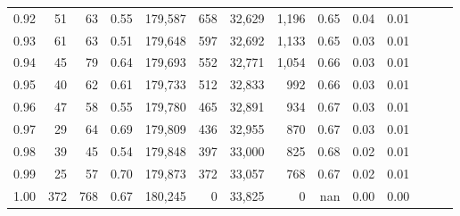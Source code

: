 \begin{tabular}{rrrrrrrrrrrrrr}
0.92 &     51 &   63 &  0.55 &  179,587 &      658 &  32,629 &   1,196 &  0.65 &  0.04 &      0.01 \\
0.93 &     61 &   63 &  0.51 &  179,648 &      597 &  32,692 &   1,133 &  0.65 &  0.03 &      0.01 \\
0.94 &     45 &   79 &  0.64 &  179,693 &      552 &  32,771 &   1,054 &  0.66 &  0.03 &      0.01 \\
0.95 &     40 &   62 &  0.61 &  179,733 &      512 &  32,833 &     992 &  0.66 &  0.03 &      0.01 \\
0.96 &     47 &   58 &  0.55 &  179,780 &      465 &  32,891 &     934 &  0.67 &  0.03 &      0.01 \\
0.97 &     29 &   64 &  0.69 &  179,809 &      436 &  32,955 &     870 &  0.67 &  0.03 &      0.01 \\
0.98 &     39 &   45 &  0.54 &  179,848 &      397 &  33,000 &     825 &  0.68 &  0.02 &      0.01 \\
0.99 &     25 &   57 &  0.70 &  179,873 &      372 &  33,057 &     768 &  0.67 &  0.02 &      0.01 \\
1.00 &    372 &  768 &  0.67 &  180,245 &        0 &  33,825 &       0 &   nan &  0.00 &      0.00 \\
\bottomrule
\end{tabular}
